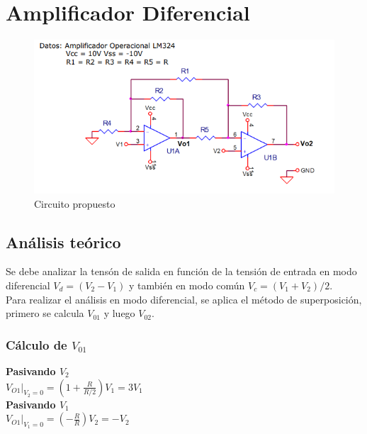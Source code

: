 \newpage
\section{Amplificador Diferencial}
\begin{figure}[htb]
	\centering
	\includegraphics[width=1\textwidth]{figuras/circuito_consigna.png}
	\caption{Circuito propuesto}
\end{figure}
\subsection{Análisis teórico}
Se debe analizar la tensón de salida en función de la tensión de entrada en modo diferencial $ V_d=(V_2-V_1)$ y también en modo común $V_c=(V_1+V_2)/2$.\\
Para realizar el análisis en modo diferencial, se aplica el método de superposición, primero se calcula $V_{01}$ y luego $V_{02}$.

\subsubsection{Cálculo de $V_{01}$}
\onehalfspacing
\begin{flushleft}
\textbf{Pasivando $V_2$}\\
$V_{O1}|_{V_2=0}=(1+\frac{R}{R/2})V_1=3V_1$ \\
\textbf{Pasivando $V_1$} \\
$V_{O1}|_{V_1=0}=(-\frac{R}{R})V_2=-V_2$ 
\end{flushleft}\begin{center}
\end{center}


